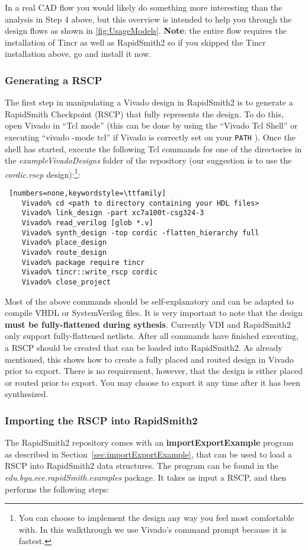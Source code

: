 \noindent In a real CAD flow you would likely do something more interesting
than the analysis in Step 4 above, but this overview is intended to help you
through the design flows as shown in \autoref{fig:UsageModels}. \textbf{Note}:
the entire flow requires the installation of Tincr as well as RapidSmith2 so if
you skipped the Tincr installation above, go and install it now.

\subsubsection{Generating a RSCP}  
The first step in manipulating a Vivado design in RapidSmith2 is to generate a
RapidSmith Checkpoint (RSCP) that fully represents the design. To do this, open
Vivado in ``Tcl mode'' (this can be done by using the ``Vivado Tcl Shell'' or
executing ``vivado -mode tcl'' if Vivado is correctly set on your \texttt{PATH}
). Once the shell has started, execute the following Tcl commands
for one of the directories in the \textit{exampleVivadoDesigns}
folder of the repository (our suggestion is to use the
\textit{cordic.rscp} design):\footnote{You can choose to implement the design
any way you feel most comfortable with. In this walkthrough we use Vivado's
command prompt because it is fastest.}:
                
\begin{lstlisting} [numbers=none,keywordstyle=\ttfamily]
	Vivado% cd <path to directory containing your HDL files>
	Vivado% link_design -part xc7a100t-csg324-3
	Vivado% read_verilog [glob *.v]
	Vivado% synth_design -top cordic -flatten_hierarchy full 
	Vivado% place_design
	Vivado% route_design
	Vivado% package require tincr
	Vivado% tincr::write_rscp cordic
	Vivado% close_project
\end{lstlisting}
Most of the above commands should be self-explanatory and can be adapted to
compile VHDL or SystemVerilog files.
It is very important to note that the design \textbf{must be fully-flattened
during sythesis}. Currently VDI and RapidSmith2 only support fully-flattened
netlists. After all commands have finished executing, a RSCP should be created
that can be loaded into RapidSmith2. As already mentioned, this shows how to
create a fully placed and routed design in Vivado prior to export.  There is no
requirement, however, that the design is either placed or routed prior to
export. You may choose to export it any time after it has been synthesized.

\subsubsection{Importing the RSCP into RapidSmith2}
The RapidSmith2 repository comes with an \textbf{importExportExample} program as
described in Section~\ref{sec:importExportExample}, that can be used to load a RSCP
into RapidSmith2 data structures. The program can be found in the
\textit{edu.byu.ece.rapidSmith.exa\-mples} package. It takes as input a RSCP,
and then performs the following steps:

